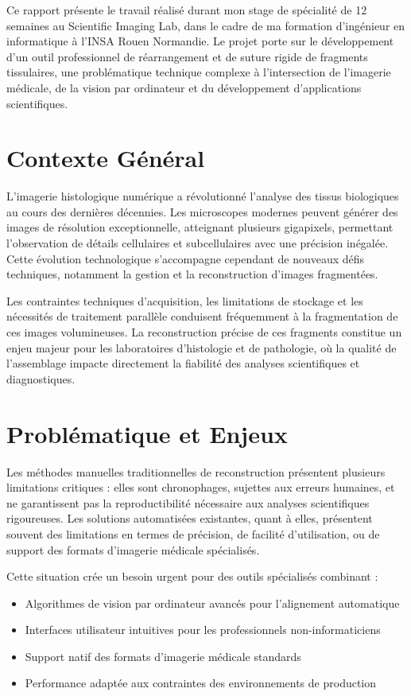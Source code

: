 \documentclass[12pt,a4paper]{report}
\begin{document}
Ce rapport présente le travail réalisé durant mon stage de spécialité de 12 semaines au Scientific Imaging Lab, dans le cadre de ma formation d'ingénieur en informatique à l'INSA Rouen Normandie. Le projet porte sur le développement d'un outil professionnel de réarrangement et de suture rigide de fragments tissulaires, une problématique technique complexe à l'intersection de l'imagerie médicale, de la vision par ordinateur et du développement d'applications scientifiques.

\section{Contexte Général}

L'imagerie histologique numérique a révolutionné l'analyse des tissus biologiques au cours des dernières décennies. Les microscopes modernes peuvent générer des images de résolution exceptionnelle, atteignant plusieurs gigapixels, permettant l'observation de détails cellulaires et subcellulaires avec une précision inégalée. Cette évolution technologique s'accompagne cependant de nouveaux défis techniques, notamment la gestion et la reconstruction d'images fragmentées.

Les contraintes techniques d'acquisition, les limitations de stockage et les nécessités de traitement parallèle conduisent fréquemment à la fragmentation de ces images volumineuses. La reconstruction précise de ces fragments constitue un enjeu majeur pour les laboratoires d'histologie et de pathologie, où la qualité de l'assemblage impacte directement la fiabilité des analyses scientifiques et diagnostiques.

\section{Problématique et Enjeux}

Les méthodes manuelles traditionnelles de reconstruction présentent plusieurs limitations critiques : elles sont chronophages, sujettes aux erreurs humaines, et ne garantissent pas la reproductibilité nécessaire aux analyses scientifiques rigoureuses. Les solutions automatisées existantes, quant à elles, présentent souvent des limitations en termes de précision, de facilité d'utilisation, ou de support des formats d'imagerie médicale spécialisés.

Cette situation crée un besoin urgent pour des outils spécialisés combinant :
\begin{itemize}
\item Algorithmes de vision par ordinateur avancés pour l'alignement automatique
\item Interfaces utilisateur intuitives pour les professionnels non-informaticiens
\item Support natif des formats d'imagerie médicale standards
\item Performance adaptée aux contraintes des environnements de production
\end{itemize}
\end{document}
